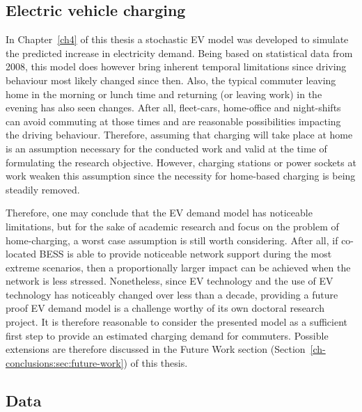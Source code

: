 \subsection{Electric vehicle charging}

In Chapter~\ref{ch4} of this thesis a stochastic EV model was developed to simulate the predicted increase in electricity demand.
Being based on statistical data from 2008, this model does however bring inherent temporal limitations since driving behaviour most likely changed since then.
Also, the typical commuter leaving home in the morning or lunch time and returning (or leaving work) in the evening has also seen changes.
After all, fleet-cars, home-office and night-shifts can avoid commuting at those times and are reasonable possibilities impacting the driving behaviour.
Therefore, assuming that charging will take place at home is an assumption necessary for the conducted work and valid at the time of formulating the research objective.
However, charging stations or power sockets at work weaken this assumption since the necessity for home-based charging is being steadily removed.

Therefore, one may conclude that the EV demand model has noticeable limitations, but for the sake of academic research and focus on the problem of home-charging, a worst case assumption is still worth considering.
After all, if co-located BESS is able to provide noticeable network support during the most extreme scenarios, then a proportionally larger impact can be achieved when the network is less stressed.
Nonetheless, since EV technology and the use of EV technology has noticeably changed over less than a decade, providing a future proof EV demand model is a challenge worthy of its own doctoral research project.
It is therefore reasonable to consider the presented model as a sufficient first step to provide an estimated charging demand for commuters.
Possible extensions are therefore discussed in the Future Work section (Section~\ref{ch-conclusions:sec:future-work}) of this thesis.

\subsection{Data}


